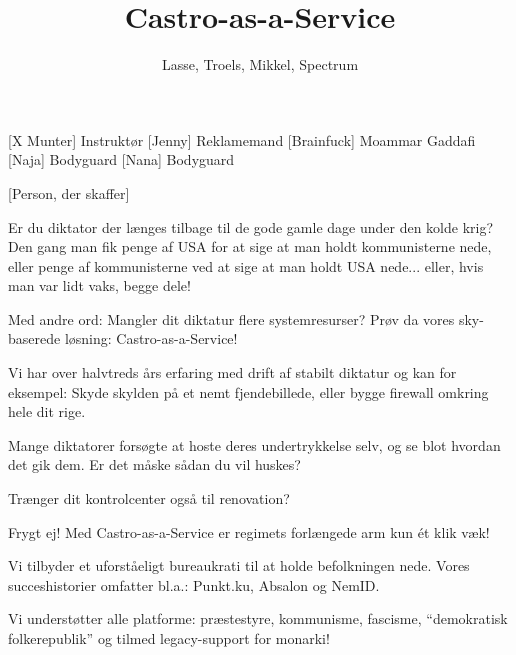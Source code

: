 \documentclass[a4paper,11pt]{article}
\title{Castro-as-a-Service}
\author{Lasse, Troels, Mikkel, Spectrum}
\begin{document}
\maketitle

\begin{roles}
  [X Munter] Instruktør
  [Jenny] Reklamemand
  [Brainfuck] Moammar Gaddafi
  [Naja] Bodyguard
  [Nana] Bodyguard
\end{roles}

\begin{props}
  [Person, der skaffer]
\end{props}

\begin{sketch}
   Er du diktator der længes tilbage til de gode gamle
  dage under den kolde krig?  Den gang man fik penge af USA for at
  sige at man holdt kommunisterne nede, eller penge af kommunisterne ved at
  sige at man holdt USA nede... eller, hvis man var lidt
  vaks, begge dele!

  Med andre ord: Mangler dit diktatur flere systemresurser?  Prøv da
  vores sky-baserede løsning: Castro-as-a-Service!


   Vi har over halvtreds års erfaring med drift af stabilt diktatur og
  kan for eksempel: Skyde skylden på et nemt fjendebillede, eller bygge firewall omkring hele dit rige.

   Mange diktatorer forsøgte at hoste deres undertrykkelse
  selv, og se blot hvordan det gik dem.  Er det måske sådan du vil huskes? 

   Trænger dit kontrolcenter også til renovation?


   Frygt ej! Med Castro-as-a-Service er regimets forlængede
  arm kun ét klik væk!


   Vi tilbyder et uforståeligt bureaukrati til at holde
  befolkningen nede.  Vores succeshistorier omfatter bl.a.: Punkt.ku,
  Absalon og NemID.

  Vi understøtter alle platforme: præstestyre, kommunisme, fascisme,
  ``demokratisk folkerepublik'' og tilmed legacy-support for monarki!


\end{sketch}
\end{document}
